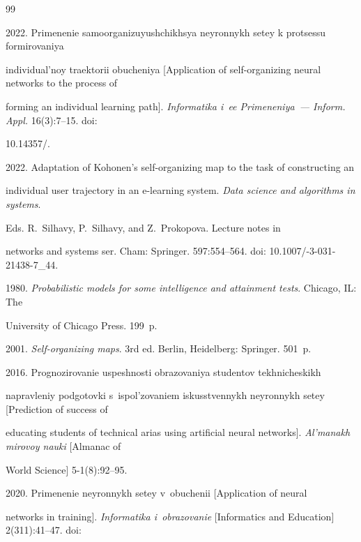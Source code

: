 {{\begin{thebibliography}{99}


 2022. Primenenie samoorganizuyushchikhsya neyronnykh setey k protsessu formirovaniya 


individual'noy traektorii obucheniya [Application of self-organizing neural networks to the process of 


forming an individual learning path]. \textit{Informatika i~ee Primeneniya~--- Inform. Appl.} 16(3):7--15. doi: 


10.14357\!/.




 2022. Adaptation of Kohonen's self-organizing map to the task of constructing an 


individual user trajectory in an e-learning system. \textit{Data science and algorithms in systems}.


Eds. R.~Silhavy, P.~Silhavy, and Z.~Prokopova. Lecture notes in 


networks and systems ser. Cham: Springer. 597:554--564. doi: 10.1007\!/-3-031-21438-7\_44.




 1980. \textit{Probabilistic models for some intelligence and attainment tests}. Chicago, IL: The 


University of Chicago Press. 199~p.




 2001. \textit{Self-organizing maps}. 3rd ed. Berlin, Heidelberg: Springer. 501~p.







 2016. Prognozirovanie uspeshnosti obrazovaniya studentov tekh\-ni\-che\-skikh 


napravleniy podgotovki s~ispol'zovaniem iskusstvennykh neyronnykh setey [Prediction of success of 


educating students of technical arias using artificial neural networks]. \textit{Al'manakh mirovoy nauki} [Almanac of 


World Science] 5-1(8):92--95.




 2020. Primenenie neyronnykh setey v~obuchenii [Application of neural 


networks in training]. \textit{Informatika i~obrazovanie} [Informatics and Education] 2(311):41--47. doi: 



\end{thebibliography}}}
